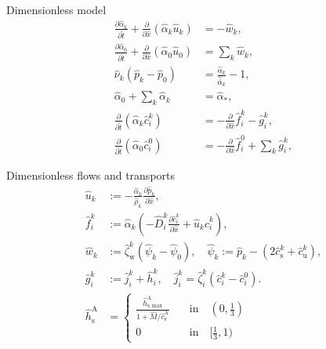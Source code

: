 \documentclass{beamer}
\begin{document}
\begin{frame}{Dimensionless model}
    \begin{align}
        \frac{\partial \hat{\alpha}_k}{\partial \hat{t}}  + \frac{\partial}{\partial \hat{x}}\left( \hat{\alpha}_k \hat{u}_k \right) &= - \hat{w}_k,\\ \label{eq:nd_1steq}
        \frac{\partial\hat{\alpha}_0}{\partial \hat{t}}+\frac{\partial}{\partial \hat{x}}\left( \hat{\alpha}_0 \hat{u}_0 \right) &=\sum_k \hat{w}_k,\\
        \hat{\nu}_k\left( \hat{p}_k - \hat{p}_0 \right) &= \frac{\hat{\alpha}_k}{\hat{\bar{\alpha}}_k}-1,\\
        \hat{\alpha}_0 + \sum_{k} \hat{\alpha}_k &= \hat{\alpha}_*,\\
        \frac{\partial}{\partial \hat{t}}\left( \hat{\alpha}_k \hat{c}_i^k \right)&=-\frac{\partial}{\partial \hat{x}} \hat{f}_i^k - \hat{g}_i^k,\\
        \frac{\partial}{\partial \hat{t}}\left( \hat{\alpha}_0 \hat{c}_i^0 \right)&=-\frac{\partial}{\partial \hat{x}} \hat{f}_i^0 + \sum_k \hat{g}_i^k,
    \end{align}
\end{frame}

\begin{frame}{Dimensionless flows and transports}
    \begin{align}
        \hat{u}_{k} &:= -\frac{\hat{\alpha}_{k}}{\hat{\rho}_{k}}\frac{\partial \hat{p}_{k}}{\partial \hat{x}},\\
        \hat{f}_i^{k} &:= \hat{\alpha}_{k}\left( -\hat{D}_i^{k} \frac{\partial \hat{c}_i^{k}}{\partial \hat{x}} + \hat{u}_{k}\hat{c}_i^{k} \right),\\
        \hat{w}_k&:= \hat{\zeta}_\mathrm{w}^k\left( \hat{\psi}_k-\hat{\psi}_0 \right),\quad\hat{\psi}_{k} := \hat{p}_{k} - \left(  2\hat{c}_\mathrm{s}^{k}+\hat{c}_\mathrm{u}^{k} \right),\\
        \hat{g}_i^k &:= \hat{j}_i^k+\hat{h}_i^k,\quad \hat{j}_i^k =\hat{\zeta}_i^k(\hat{c}_i^k-\hat{c}_i^0). \label{eq:nd_lasteq}\\
        \hat{h}_\mathrm{s}^\mathrm{A} &= \begin{cases}
            \frac{\hat{h}_\mathrm{s,max}^\mathrm{A}}{1+\hat{M}/\hat{c}_\mathrm{s}^\mathrm{A}}\quad &\text{in}\quad (0,\frac{1}{3})\\
            0\quad &\text{in}\quad [\frac{1}{3},1)
        \end{cases}
    \end{align}
\end{frame}
\end{document}
